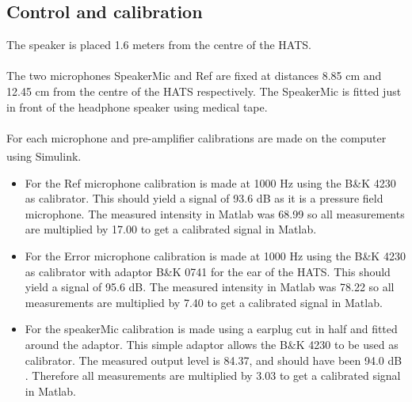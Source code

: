 \subsection{Control and calibration}
The speaker is placed 1.6 meters from the centre of the HATS. \\\\
The two microphones SpeakerMic and Ref are fixed at distances 8.85 cm and 12.45 cm from the centre of the HATS respectively. The SpeakerMic is fitted just in front of the headphone speaker using medical tape.\\\\
For each microphone and pre-amplifier calibrations are made on the computer using Simulink\textsuperscript{\textregistered}.
\begin{itemize}
	\item For the Ref microphone calibration is made at 1000 Hz using the B\&K 4230 as calibrator. This should yield a signal of 93.6 dB as it is a pressure field microphone. The measured intensity in Matlab was 68.99 so all measurements are multiplied by 17.00 to get a calibrated signal in Matlab. 
	\item For the Error microphone calibration is made at 1000 Hz using the B\&K 4230 as calibrator with adaptor B\&K 0741 for the ear of the HATS. This should yield a signal of 95.6 dB. The measured intensity in Matlab was 78.22 so all measurements are multiplied by 7.40 to get a calibrated signal in Matlab. 
	\item For the speakerMic calibration is made using a earplug cut in half and fitted around the adaptor. This simple adaptor allows the B\&K 4230 to be used as calibrator. The measured output level is 84.37, and should have been 94.0 dB . Therefore all measurements are multiplied by 3.03 to get a calibrated signal in Matlab. 
\end{itemize}
 
